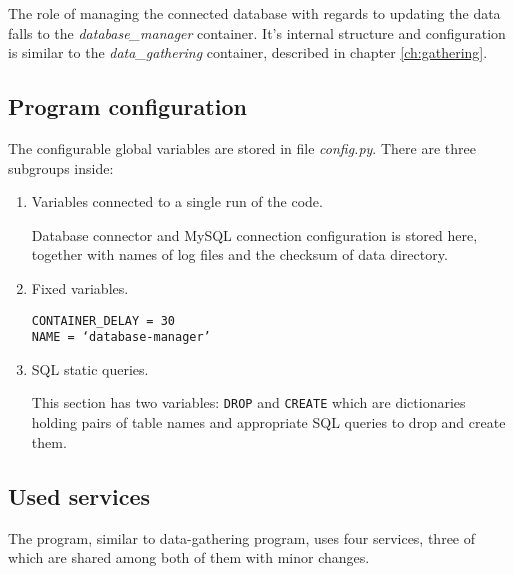 The role of managing the connected database with regards to updating the data falls to the \textit{database\_manager} container. It's internal structure and configuration is similar to the \textit{data\_gathering} container, described in chapter \ref{ch:gathering}.

\subsection{Program configuration}
The configurable global variables are stored in file \textit{config.py}. There are three subgroups inside:

\begin{enumerate}
    \item Variables connected to a single run of the code. \par
          Database connector and MySQL connection configuration is stored here, together with names of log files and the checksum of data directory.
    \item Fixed variables. \par
          \texttt{CONTAINER\_DELAY = 30 \\ NAME = `database-manager'}
    \item SQL static queries. \par
          This section has two variables: \texttt{DROP} and \texttt{CREATE} which are dictionaries holding pairs of table names and appropriate SQL queries to drop and create them.
\end{enumerate}


\subsection{Used services}
The program, similar to data-gathering program, uses four services, three of which are shared among both of them with minor changes.

